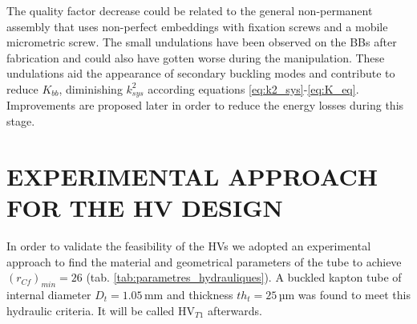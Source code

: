 \documentclass[3p,twocolumn,preprint]{elsarticle}
\begin{document}
The quality factor decrease could be related to the general non-permanent assembly that uses non-perfect embeddings with fixation screws and a mobile micrometric screw. The small undulations have been observed on the BBs after fabrication and could also have gotten worse during the manipulation. These undulations aid the appearance of secondary buckling modes and contribute to reduce $K_{bb}$, diminishing $k^2_{sys}$ according equations \ref{eq:k2_sys}-\ref{eq:K_eq}. Improvements are proposed later in order to reduce the energy losses during this stage.

\section{EXPERIMENTAL APPROACH FOR THE HV \mbox{DESIGN}}
\label{sec:EXPERIMENTAL APPROACH FOR THE HV DESIGN}
In order to validate the feasibility of the HVs we adopted an experimental approach to find the material and geometrical parameters of the tube to achieve $(r_{Cf})_{min}=26$ (tab. \ref{tab:parametres_hydrauliques}). A buckled kapton tube \cite{Dupont2012} of internal diameter $D_t=1.05$\,mm and thickness $th_t=25$\,µm was found to meet this hydraulic criteria. It will be called HV$_{T1}$ afterwards. 
\end{document}
